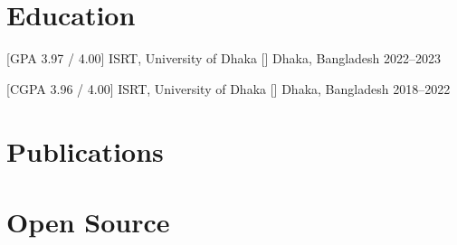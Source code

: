 \documentclass[10pt]{article}
\begin{document}

\section*{Education}

[GPA 3.97 / 4.00]
{ISRT, University of Dhaka}
[]
{Dhaka, Bangladesh}
{2022--2023}

\medskip

[CGPA 3.96 / 4.00]
{ISRT, University of Dhaka}
[]
{Dhaka, Bangladesh}
{2018--2022}



\section*{Publications}

\nocite{*}
\printbibliography[heading=none]




\section*{Open Source}
\end{document}
